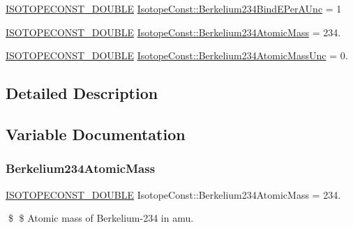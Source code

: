 \begin{DoxyCompactItemize}
\mbox{\hyperlink{group___isotope_const-_macros_ga8f45a7272ce02c0b4c65c44636ed719a}{I\+S\+O\+T\+O\+P\+E\+C\+O\+N\+S\+T\+\_\+\+D\+O\+U\+B\+LE}} \mbox{\hyperlink{group___isotope_const-_berkelium-_bk234_ga7b85c693414fe58fb538039b0fbaf70b}{Isotope\+Const\+::\+Berkelium234\+Bind\+E\+Per\+A\+Unc}} = 1
\item 
\mbox{\hyperlink{group___isotope_const-_macros_ga8f45a7272ce02c0b4c65c44636ed719a}{I\+S\+O\+T\+O\+P\+E\+C\+O\+N\+S\+T\+\_\+\+D\+O\+U\+B\+LE}} \mbox{\hyperlink{group___isotope_const-_berkelium-_bk234_ga1163c66214ebb3a2c9d250791f094689}{Isotope\+Const\+::\+Berkelium234\+Atomic\+Mass}} = 234.
\item 
\mbox{\hyperlink{group___isotope_const-_macros_ga8f45a7272ce02c0b4c65c44636ed719a}{I\+S\+O\+T\+O\+P\+E\+C\+O\+N\+S\+T\+\_\+\+D\+O\+U\+B\+LE}} \mbox{\hyperlink{group___isotope_const-_berkelium-_bk234_ga39c22151966f421a936c981b72e36c5e}{Isotope\+Const\+::\+Berkelium234\+Atomic\+Mass\+Unc}} = 0.
\end{DoxyCompactItemize}


\subsection{Detailed Description}


\subsection{Variable Documentation}
\mbox{\label{group___isotope_const-_berkelium-_bk234_ga1163c66214ebb3a2c9d250791f094689}} 
\subsubsection{\texorpdfstring{Berkelium234\+Atomic\+Mass}{Berkelium234AtomicMass}}
{\footnotesize\ttfamily \mbox{\hyperlink{group___isotope_const-_macros_ga8f45a7272ce02c0b4c65c44636ed719a}{I\+S\+O\+T\+O\+P\+E\+C\+O\+N\+S\+T\+\_\+\+D\+O\+U\+B\+LE}} Isotope\+Const\+::\+Berkelium234\+Atomic\+Mass = 234.}

\$ \$ Atomic mass of Berkelium-\/234 in amu. \mbox{\label{group___isotope_const-_berkelium-_bk234_ga39c22151966f421a936c981b72e36c5e}} 
